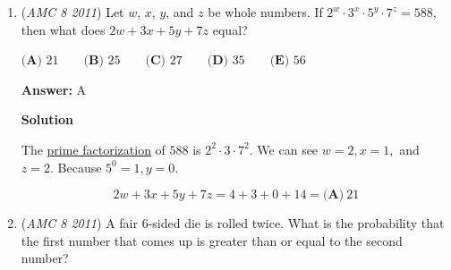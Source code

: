 \begin{enumerate}
\textbf{Solution 2 (Using Heron's Formula)}

Using Heron's formula, we can calculate the area of the two triangles. The formula states that
 \[A = \sqrt{s(s - a)(s - b)(s - c)}\]where $s$ is the semiperimeter of a triangle with side lengths $a$, $b$, and $c$.

 For the 25-25-30 triangle, 
 \[s = \frac{25 + 25 + 30}{2} = 40\]Therefore,
 \[A = \sqrt{40 \cdot 15 \cdot 15 \cdot 10} = 300\]

 For the 25-25-40 triangle, 
 \[s = \frac{25 + 25 + 40}{2} = 45\]Therefore,
 \[B = \sqrt{45 \cdot 20 \cdot 20 \cdot 5} = 300\]

 Hence, 
 \[A = B \hspace{0.15in} \Longrightarrow \hspace{0.15in} \boxed{\textbf{(C)}}\]




\textbf{Solution 3 (Simple)}

\textbf{ Assume } the triangles are right. Then, the 25-25-30 has hypotenuse 30, whereas 25-25-40 has hypotenuse 40. Because the formula for a triangles' area is $(bh)/2$, the hypotenuse does not matter. So, since the base and height are the same, the area will also be the same meaning 
 \[A = B \hspace{0.15in} \Longrightarrow \hspace{0.15in} \boxed{\textbf{(C)}}\]



	\item (\textit{AMC 8 2011}) Let $w$, $x$, $y$, and $z$ be whole numbers. If $2^w \cdot 3^x \cdot 5^y \cdot 7^z = 588$, then what does $2w + 3x + 5y + 7z$ equal?


 $\textbf{(A) } 21\qquad\textbf{(B) }25\qquad\textbf{(C) }27\qquad\textbf{(D) }35\qquad\textbf{(E) }56$

 \textbf{Answer: }A



\textbf{Solution}

The \href{https://artofproblemsolving.com/wiki/index.php?title=Prime\_factorization}{prime factorization} of $588$ is $2^2\cdot3\cdot7^2.$ We can see $w=2, x=1,$ and $z=2.$ Because $5^0=1, y=0.$

 \[2w+3x+5y+7z=4+3+0+14=\boxed{\textbf{(A)}\ 21}\]



	\item (\textit{AMC 8 2011}) A fair 6-sided die is rolled twice. What is the probability that the first number that comes up is greater than or equal to the second number?



\end{enumerate}
